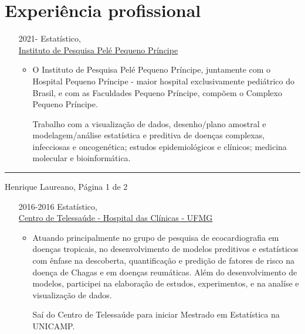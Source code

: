 \documentclass[12pt]{article}
\newcommand{\horrule}[1]{\noindent\rule{\linewidth}{#1}}
\begin{document}
\vspace{-0.5cm}
\section*{Experi\^{e}ncia profissional}

\begin{itemize}
 \item[2021-] Estat\'{i}stico,\\
              \href{http://www.pelepequenoprincipe.org.br/}{\color{blue}
                Instituto de Pesquisa Pel\'{e} Pequeno Pr\'{i}ncipe}
  \begin{itemize}
  \item O Instituto de Pesquisa Pel\'{e} Pequeno Pr\'{i}ncipe,
        juntamente com o Hospital Pequeno Pr\'{i}ncipe - maior hospital
        exclusivamente pedi\'{a}trico do Brasil, e com as Faculdades
        Pequeno Pr\'{i}ncipe, comp\~{o}em o Complexo Pequeno
        Pr\'{i}ncipe.

        Trabalho com a visualiza\c{c}\~{a}o de dados, desenho/plano
        amostral e modelagem/an\'{a}lise estat\'{i}stica e preditiva de
        doen\c{c}as complexas, infecciosas e oncogen\'{e}tica; estudos
        epidemiol\'{o}gicos e cl\'{i}nicos; medicina molecular e
        bioinform\'{a}tica.
  \end{itemize}
\end{itemize}

\vspace{\fill}
\horrule{1pt}
\noindent Henrique Laureano, \hfill P\'{a}gina 1 de 2

\begin{itemize}
 \item[2016-2016] Estat\'{i}stico,\\
                  \href{https://telessaude.hc.ufmg.br/}{\color{blue}
                    Centro de Telessa\'{u}de -
                    Hospital das Cl\'{i}nicas - UFMG}
  \begin{itemize}
   \item Atuando principalmente no grupo de pesquisa de ecocardiografia
         em doen\c{c}as tropicais, no desenvolvimento de modelos
         preditivos e estat\'{i}sticos com \^{e}nfase na descoberta,
         quantifica\c{c}\~{a}o e predi\c{c}\~{a}o de fatores de risco na
         doen\c{c}a de Chagas e em doen\c{c}as reum\'{a}ticas. Al\'{e}m
         do desenvolvimento de modelos, participei na elabora\c{c}\~{a}o
         de estudos, experimentos, e na anal\'{i}se e
         visualiza\c{c}\~{a}o de dados.

         Sa\'{i} do Centro de Telessa\'{u}de para iniciar Mestrado em
         Estat\'{i}stica na UNICAMP.
  \end{itemize}
\end{itemize}
\end{document}
